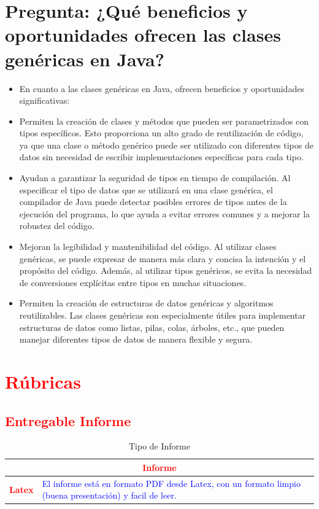 \documentclass{article}
\begin{document}
\section{Pregunta: ¿Qué beneficios y oportunidades ofrecen las clases genéricas en Java?}
	\begin{itemize}
		\item En cuanto a las clases genéricas en Java, ofrecen beneficios y oportunidades significativas:
		\item Permiten la creación de clases y métodos que pueden ser parametrizados con tipos específicos. Esto proporciona un alto grado de reutilización de código, ya que una clase o método genérico puede ser utilizado con diferentes tipos de datos sin necesidad de escribir implementaciones específicas para cada tipo.
		\item Ayudan a garantizar la seguridad de tipos en tiempo de compilación. Al especificar el tipo de datos que se utilizará en una clase genérica, el compilador de Java puede detectar posibles errores de tipos antes de la ejecución del programa, lo que ayuda a evitar errores comunes y a mejorar la robustez del código.
		\item Mejoran la legibilidad y mantenibilidad del código. Al utilizar clases genéricas, se puede expresar de manera más clara y concisa la intención y el propósito del código. Además, al utilizar tipos genéricos, se evita la necesidad de conversiones explícitas entre tipos en muchas situaciones.
		\item Permiten la creación de estructuras de datos genéricas y algoritmos reutilizables. Las clases genéricas son especialmente útiles para implementar estructuras de datos como listas, pilas, colas, árboles, etc., que pueden manejar diferentes tipos de datos de manera flexible y segura.
	\end{itemize}		
	\section{\textcolor{red}{Rúbricas}}
	
	\subsection{\textcolor{red}{Entregable Informe}}
	\begin{table}[H]
		\caption{Tipo de Informe}
		\setlength{\tabcolsep}{0.5em} %
		{\renewcommand{\arraystretch}{1.5}%
		\begin{tabular}{|p{3cm}|p{12cm}|}
			\hline
			\multicolumn{2}{|c|}{\textbf{\textcolor{red}{Informe}}}  \\
			\hline 
			\textbf{\textcolor{red}{Latex}} & \textcolor{blue}{El informe está en formato PDF desde Latex,  con un formato limpio (buena presentación) y facil de leer.}   \\ 
			\hline 
			
			
		\end{tabular}
	}
	\end{table}
\end{document}
